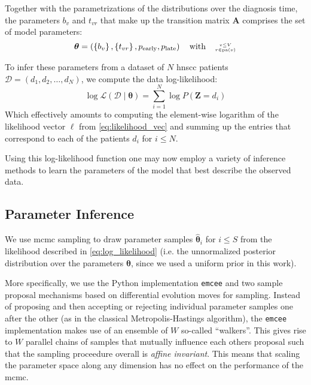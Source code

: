 \documentclass[twocolumn]{aastex631}
\begin{document}
Together with the parametrizations of the distributions over the diagnosis time, the parameters $b_v$ and $t_{vr}$ that make up the transition matrix $\mathbf{A}$ comprises the set of model parameters:
%
\begin{equation}
    \boldsymbol{\theta} = \left( \left\{ b_v \right\}, \left\{ t_{vr} \right\}, p_\text{early}, p_\text{late} \right) \quad \text{with} \quad \genfrac{}{}{0pt}{2}{v\leq V}{r\in\operatorname{pa}(v)}
\end{equation}

To infer these parameters from a dataset of $N$ \gls{hnscc} patients $\boldsymbol{\mathcal{D}} = \left( d_1, d_2, \ldots, d_N \right)$, we compute the data log-likelihood:
%
\begin{equation} \label{eq:log_likelihood}
    \log\mathcal{L} \left( \boldsymbol{\mathcal{D}} \mid \boldsymbol{\theta} \right) = \sum_{i=1}^N \log P \left( \mathbf{Z} = d_i \right)
\end{equation}
%
Which effectively amounts to computing the element-wise logarithm of the likelihood vector $\boldsymbol{\ell}$ from \cref{eq:likelihood_vec} and summing up the entries that correspond to each of the patients $d_i$ for $i\leq N$. 

Using this log-likelihood function one may now employ a variety of inference methods to learn the parameters of the model that best describe the observed data.


\subsection{Parameter Inference}
\label{subsec:formalism:inference}

We use \gls{mcmc} sampling to draw parameter samples $\boldsymbol{\hat{\theta}}_i$ for $i \leq S$ from the likelihood described in \cref{eq:log_likelihood} (i.e. the unnormalized posterior distribution over the parameters $\boldsymbol{\theta}$, since we used a uniform prior in this work).

More specifically, we use the Python implementation \texttt{emcee} \cite{foreman-mackey_emcee_2013} and two sample proposal mechanisms based on differential evolution moves \cite{ter_braak_differential_2008,nelson_run_2013} for sampling. Instead of proposing and then accepting or rejecting individual parameter samples one after the other (as in the classical Metropolis-Hastings algorithm), the \texttt{emcee} implementation makes use of an ensemble of $W$ so-called ``walkers''. This gives rise to $W$ parallel chains of samples that mutually influence each others proposal such that the sampling proceedure overall is \emph{affine invariant}. This means that scaling the parameter space along any dimension has no effect on the performance of the \gls{mcmc}.
\end{document}
